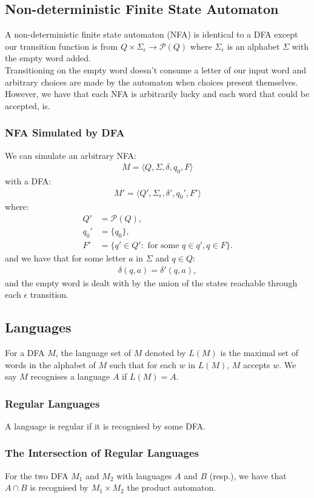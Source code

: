 \subsection{Non-deterministic Finite State Automaton}

A non-deterministic finite state automaton (NFA) is identical
to a DFA except our transition function is from 
$Q \times \Sigma_\epsilon \to \mathcal{P}(Q)$ where
$\Sigma_\epsilon$ is an alphabet $\Sigma$ with the empty word
added.
\\[\baselineskip]
Transitioning on the empty word doesn't consume a letter of our
input word and arbitrary choices are made by the automaton when
choices present themselves. However, we have that each NFA is
arbitrarily lucky and each word that could be accepted, is.

\subsubsection{NFA Simulated by DFA}

We can simulate an arbitrary NFA: \begin{gather*}
    M =  \langle Q, \Sigma, \delta, q_0, F \rangle
\end{gather*}
with a DFA: \begin{gather*}
    M' = \langle Q', \Sigma_\epsilon, \delta', q_0', F' \rangle
\end{gather*} where: \begin{align*}
    Q'   &= \mathcal{P}(Q), \\
    q_0' &= \{q_0\}, \\
    F'   &= \{q' \in Q' : \text{ for some } q \in q', q \in F\}.
\end{align*} and we have that for some letter $a$ in $\Sigma$
and $q \in Q$: \begin{gather*}
    \delta(q, a) = \delta'(q, a),
\end{gather*} and the empty word is dealt with by the union of
the states reachable through each $\epsilon$ transition.
    

\subsection{Languages}

For a DFA $M$, the language set of $M$ denoted by $L(M)$
is the maximal set of words in the alphabet of $M$ such that
for each $w$ in $L(M)$, $M$ accepts $w$. We say $M$ recognises
a language $A$ if $L(M) = A$.

\subsubsection{Regular Languages}

A language is regular if it is recognised by some DFA.

\subsubsection{The Intersection of Regular Languages}

For the two DFA $M_1$ and $M_2$ with languages
$A$ and $B$ (resp.), we have that $A \cap B$ is
recognised by $M_1 \times M_2$ the product automaton.
